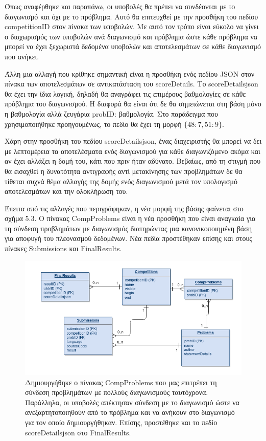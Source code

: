 \documentclass[diploma]{softlab-thesis}
\begin{document}
\bigskip

Όπως αναφέρθηκε και παραπάνω, οι υποβολές θα πρέπει να συνδέονται με το
διαγωνισμό και όχι με το πρόβλημα. Αυτό θα επιτευχθεί με την προσθήκη του
πεδίου competitionID στον πίνακα των υποβολών. Με αυτό τον τρόπο είναι εύκολο να
γίνει ο διαχωρισμός των υποβολών ανά διαγωνισμό και πρόβλημα ώστε κάθε πρόβλημα
να μπορεί να έχει ξεχωριστά δεδομένα υποβολών και αποτελεσμάτων σε κάθε
διαγωνισμό που ανήκει.

\bigskip

Άλλη μια αλλαγή που κρίθηκε σημαντική είναι η προσθήκη ενός πεδίου JSON στον
πίνακα των αποτελεσμάτων σε αντικατάσταση του scoreDetails. Το scoreDetailsjson
θα έχει την ίδια λογική, δηλαδή θα αναγράφει τις επιμέρους βαθμολογίες σε κάθε
πρόβλημα του διαγωνισμού. Η διαφορά θα είναι ότι δε θα σημειώνεται στη βάση μόνο
η βαθμολογία αλλά ζευγάρια probID: βαθμολογία. Στο παράδειγμα που χρησιμοποιήθηκε
προηγουμένως, το πεδίο θα έχει τη μορφή $\{48: 7, 51: 9\}$.

\bigskip

Χάρη στην προσθήκη του πεδίου scoreDetailsjson, ένας διαχειριστής θα μπορεί να δει
με λεπτομέρεια τα αποτελέσματα ενός διαγωνισμού για κάθε διαγωνιζόμενο ακόμα και
αν έχει αλλάξει η δομή του, κάτι που πριν ήταν αδύνατο. Βεβαίως, από τη στιγμή που
θα εισαχθεί η δυνατότητα αντιγραφής αντί μετακίνησης των προβλημάτων δε θα τίθεται
συχνά θέμα αλλαγής της δομής ενός διαγωνισμού μετά τον υπολογισμό αποτελεσμάτων και
την ολοκλήρωση του.

\bigskip

Έπειτα από τις αλλαγές που περιγράφηκαν, η νέα μορφή της βάσης φαίνεται στο
σχήμα 5.3. Ο πίνακας CompProblems είναι η νέα προσθήκη που είναι αναγκαία για
τη σύνδεση προβλημάτων με διαγωνισμός διατηρώντας μια κανονικοποιημένη βάση για
αποφυγή του πλεονασμού δεδομένων. Νέα πεδία προστέθηκαν επίσης και στους
πίνακες Submissions και FinalResults.

\bigskip

\begin{figure}
  \centering
  \includegraphics[scale=0.5,trim=4 4 4 4,clip]{Figures/sepafter.png}
  \caption[Βάση μετά το διαχωρισμό]{Δημιουργήθηκε ο πίνακας CompProblems που
  μας επιτρέπει τη σύνδεση προβλημάτων με πολλούς διαγωνισμούς ταυτόχρονα.
  Παράλληλα, οι υποβολές απέκτησαν σύνδεση με το διαγωνισμό ώστε να
  ανεξαρτητοποιηθούν από το πρόβλημα και να ανήκουν στο διαγωνισμό για τον
  οποίο δημιουργήθηκαν. Επίσης, προστέθηκε και το πεδίο scoreDetailsjson στο
  FinalResults.}
\end{figure}
\end{document}
